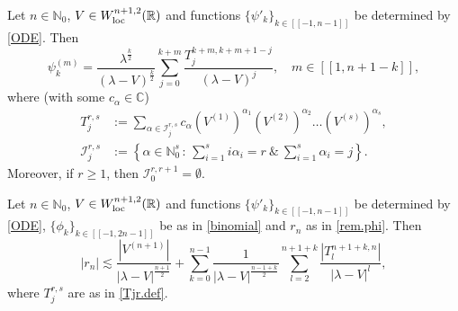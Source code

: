 \begin{Lemma}\label{lem:str}
Let $n \in {\mathbb{N}}_0$, $V \in W^{n+1,2}_{\rm loc}({\mathbb{R}})$ and functions $\{\psi'_k\}_{k\in[[-1,n-1]]}$ be determined by \eqref{ODE}.
Then
\begin{equation}
\psi_k^{(m)} = \frac{\lambda^\frac k2}{(\lambda-V)^\frac k2} \sum_{j=0}^{k+m} \frac{T_j^{k+m,k+m+1-j}}{(\lambda-V)^j},  \quad m\in [[1,n+1-k]],
\end{equation}
where (with some $c_\alpha \in {\mathbb{C}}$)
\begin{equation}\label{Tjr.def}
\begin{aligned}
T_j^{r,s} & := 
\sum_{\alpha \in {\mathcal I}_j^{r,s}} c_\alpha (V^{(1)})^{\alpha_1} (V^{(2)})^{\alpha_2} \dots (V^{(s)})^{\alpha_s},
\\
{\mathcal I}_j^{r,s} & := 
\left\{ \alpha \in {\mathbb{N}}_0^s \, : \, \sum_{i=1}^s i \alpha_i = r \ \&  \ \sum_{i=1}^s  \alpha_i = j \right\}. 
\end{aligned}
\end{equation}
Moreover, if $r \geq 1$, then ${\mathcal I}_0^{r,r+1} = \emptyset$.
\end{Lemma}

\begin{Lemma}\label{lem:r_n.est}
Let $n \in {\mathbb{N}}_0$, $V \in W^{n+1,2}_{\rm loc}({\mathbb{R}})$ and functions $\{\psi'_k\}_{k\in[[-1,n-1]]}$ be determined by \eqref{ODE}, $\{\phi_k\}_{k \in [[-1,2n-1]]}$ be as in \eqref{binomial} and $r_n$ as in \eqref{rem.phi}.
Then
\begin{equation}\label{rn.est}
|r_n| {\lesssim} 
\frac{|V^{(n+1)}|}{|\lambda-V|^\frac{n+1}{2}}
+
\sum_{k=0}^{n-1} \frac{1}{|\lambda-V|^\frac{n-1+k}2} \sum_{l=2}^{n+1+k} \frac{|T_l^{n+1+k,n}|}{|\lambda-V|^l},
\end{equation}
where $T_j^{r,s}$ are as in \eqref{Tjr.def}.
\end{Lemma}

